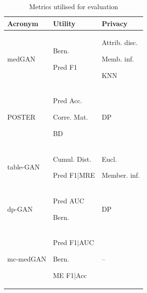 \begin{landscape}
\renewcommand{\arraystretch}{1.02} %
\begin{table}[htbp]
\caption{Metrics utilised for evaluation} \label{tab:results_review} 

\begin{tabular}{p{26mm} p{84mm} p{60mm}}
\hline
Acronym & Utility & Privacy \\
\hline
medGAN	& \begin{enumerate*}
    \item Bern.
    \item Pred F1
\end{enumerate*} & \begin{enumerate*}
\item Attrib. disc. \item Memb. inf. \item KNN	\end{enumerate*}  \\


POSTER &	\begin{enumerate*}
\item Pred Acc.
\item Corre. Mat. \item BD
\end{enumerate*} & DP\\
table-GAN &	\begin{enumerate*}
\item Cumul. Dist.
\item Pred F1$\vert$MRE
 \end{enumerate*} &	\begin{enumerate*} \item Eucl.
\item Member. inf.   \end{enumerate*}  \\

dp-GAN &	\begin{enumerate*} \item Pred AUC \item Bern. \end{enumerate*} &	DP	 \\

mc-medGAN & 	\begin{enumerate*} \item Pred F1$\vert$AUC \item Bern. \item ME F1$\vert$Acc\end{enumerate*} & -- 	\\


\end{tabular}
\end{table}
\end{landscape}
